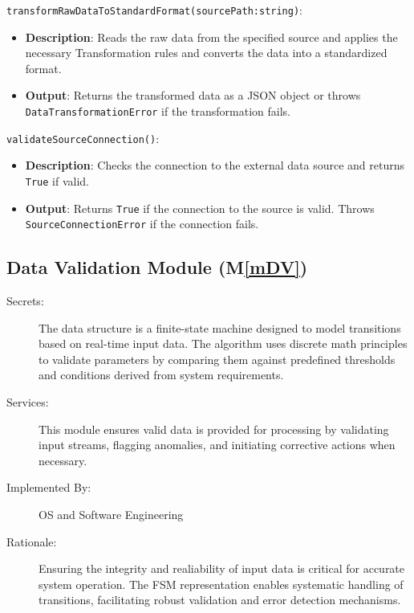 \documentclass[12pt, titlepage]{article}
\newcommand{\mref}[1]{M\ref{#1}}
\begin{document}
\begin{description}
\begin{description}
  \item[Local Function:] 
  \item
  \texttt{transformRawDataToStandardFormat(sourcePath:string)}:
  \item
  \begin{itemize}
    \item \textbf{Description}: Reads the raw data from the specified source and applies the necessary Transformation
    rules and converts the data into a standardized format.
  \end{itemize}
  \item 
  \begin{itemize}
    \item \textbf{Output}: Returns the transformed data as a JSON object or throws \\
    \texttt{DataTransformationError} if the transformation fails.
  \end{itemize}
  \item 

  \texttt{validateSourceConnection()}:
  \item 
  \begin{itemize}
    \item \textbf{Description}: Checks the connection to the external data source and returns \texttt{True} if valid.
  \end{itemize}
  \item 
  \begin{itemize}
    \item \textbf{Output}: Returns \texttt{True} if the connection to the source is valid. Throws \\
   \texttt{SourceConnectionError} if the connection fails.
  \end{itemize}
\end{description}

\subsection{Data Validation Module (\mref{mDV})}
\begin{description}
  \item[Secrets:] The data structure is a finite-state machine designed to model transitions based on real-time 
  input data. The algorithm uses discrete math principles to validate parameters by comparing them against predefined
  thresholds and conditions derived from system requirements.
  \item[Services:] This module ensures valid data is provided for processing by validating input streams, flagging
  anomalies, and initiating corrective actions when necessary.
  \item[Implemented By:] OS and Software Engineering
  \item[Rationale:] Ensuring the integrity and realiability of input data is critical for accurate system operation.
  The FSM representation enables systematic handling of transitions, facilitating robust validation and error 
  detection mechanisms.
\end{description}


\end{description}
\end{document}
